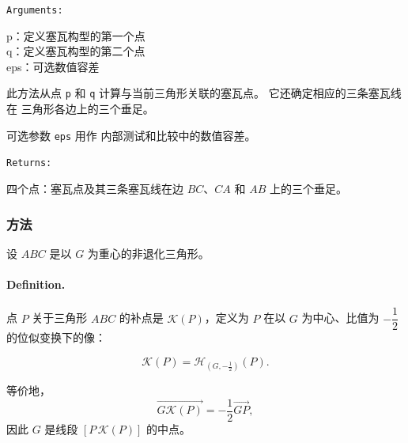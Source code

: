 \medskip

\texttt{Arguments: }

p：定义塞瓦构型的第一个点 \\
q：定义塞瓦构型的第二个点 \\
eps：可选数值容差 \\


\medskip

此方法从点 \texttt{p} 和 \texttt{q} 计算与当前三角形关联的塞瓦点。
它还确定相应的三条塞瓦线在
三角形各边上的三个垂足。

可选参数 \texttt{eps} 用作
内部测试和比较中的数值容差。

\medskip

\texttt{Returns: }

四个点：塞瓦点及其三条塞瓦线在边
$BC$、$CA$ 和 $AB$ 上的三个垂足。


\begin{tkzexample}[latex=.5\textwidth]
\begin{center}
\end{center}
\end{tkzexample}



\subsubsection{方法 }
\label{ssub:complement}

设 $ABC$ 是以 $G$ 为重心的非退化三角形。

\paragraph{Definition.}
点 $P$ 关于三角形 $ABC$ 的补点是 $\mathcal{K}(P)$，定义为 $P$ 在以 $G$ 为中心、比值为 $-\dfrac{1}{2}$ 的位似变换下的像：

\[
\mathcal{K}(P)=\mathcal{H}_{(G,-\frac{1}{2})}(P).
\]

等价地，
\[
\overrightarrow{G\mathcal{K}(P)}=-\dfrac{1}{2}\overrightarrow{GP},
\]
因此 $G$ 是线段 $[P\,\mathcal{K}(P)]$ 的中点。

